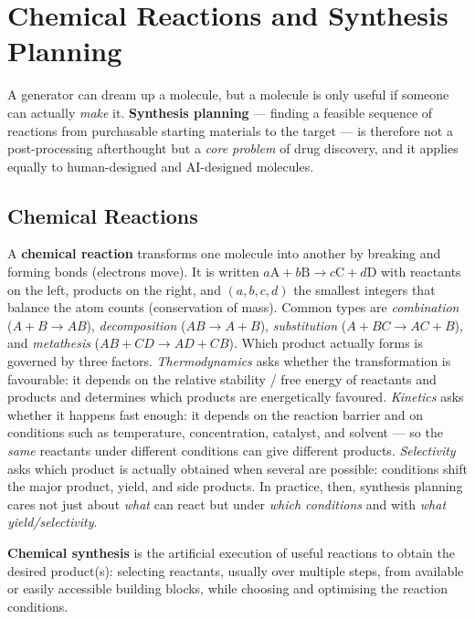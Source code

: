 \documentclass[11pt, oneside]{book}
\begin{document}
\chapter{Chemical Reactions and Synthesis Planning}
\label{chap:synthesis}

A generator can dream up a molecule, but a molecule is only useful if someone can
actually \emph{make} it. \textbf{Synthesis planning} --- finding a feasible sequence
of reactions from purchasable starting materials to the target --- is therefore not
a post-processing afterthought but a \emph{core problem} of drug discovery, and it
applies equally to human-designed and AI-designed molecules.

\section{Chemical Reactions}

A \textbf{chemical reaction} transforms one molecule into another by breaking and
forming bonds (electrons move). It is written $a\mathrm{A} + b\mathrm{B} \to
c\mathrm{C} + d\mathrm{D}$ with reactants on the left, products on the right, and
$(a,b,c,d)$ the smallest integers that balance the atom counts (conservation of
mass). Common types are \emph{combination} ($A+B\to AB$), \emph{decomposition}
($AB\to A+B$), \emph{substitution} ($A+BC\to AC+B$), and \emph{metathesis}
($AB+CD\to AD+CB$). Which product actually forms is governed by three factors.
\emph{Thermodynamics} asks whether the transformation is favourable: it depends on
the relative stability / free energy of reactants and products and determines which
products are energetically favoured. \emph{Kinetics} asks whether it happens fast
enough: it depends on the reaction barrier and on conditions such as temperature,
concentration, catalyst, and solvent --- so the \emph{same} reactants under different
conditions can give different products. \emph{Selectivity} asks which product is
actually obtained when several are possible: conditions shift the major product,
yield, and side products. In practice, then, synthesis planning cares not just about
\emph{what} can react but under \emph{which conditions} and with \emph{what
yield/selectivity}.

\textbf{Chemical synthesis} is the artificial execution of useful reactions to obtain
the desired product(s): selecting reactants, usually over multiple steps, from
available or easily accessible building blocks, while choosing and optimising the
reaction conditions.
\end{document}
